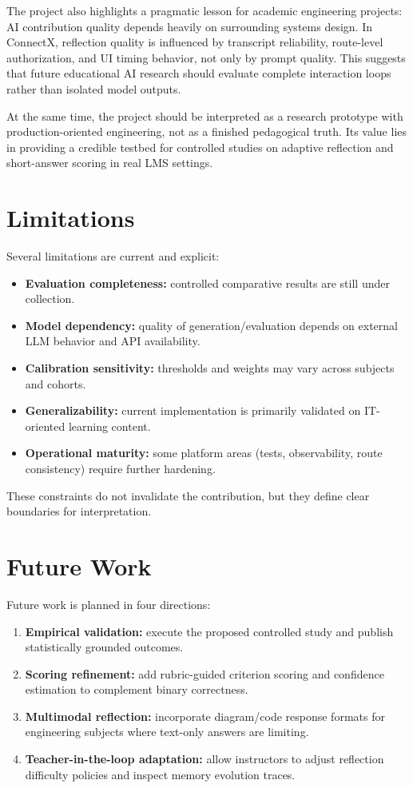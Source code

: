 \documentclass[conference]{IEEEtran}
\begin{document}
The project also highlights a pragmatic lesson for academic engineering projects: AI contribution quality depends heavily on surrounding systems design. In ConnectX, reflection quality is influenced by transcript reliability, route-level authorization, and UI timing behavior, not only by prompt quality. This suggests that future educational AI research should evaluate complete interaction loops rather than isolated model outputs.

At the same time, the project should be interpreted as a research prototype with production-oriented engineering, not as a finished pedagogical truth. Its value lies in providing a credible testbed for controlled studies on adaptive reflection and short-answer scoring in real LMS settings.

\section{Limitations}
Several limitations are current and explicit:
\begin{itemize}
\item \textbf{Evaluation completeness:} controlled comparative results are still under collection.
\item \textbf{Model dependency:} quality of generation/evaluation depends on external LLM behavior and API availability.
\item \textbf{Calibration sensitivity:} thresholds and weights may vary across subjects and cohorts.
\item \textbf{Generalizability:} current implementation is primarily validated on IT-oriented learning content.
\item \textbf{Operational maturity:} some platform areas (tests, observability, route consistency) require further hardening.
\end{itemize}

These constraints do not invalidate the contribution, but they define clear boundaries for interpretation.

\section{Future Work}
Future work is planned in four directions:
\begin{enumerate}
\item \textbf{Empirical validation:} execute the proposed controlled study and publish statistically grounded outcomes.
\item \textbf{Scoring refinement:} add rubric-guided criterion scoring and confidence estimation to complement binary correctness.
\item \textbf{Multimodal reflection:} incorporate diagram/code response formats for engineering subjects where text-only answers are limiting.
\item \textbf{Teacher-in-the-loop adaptation:} allow instructors to adjust reflection difficulty policies and inspect memory evolution traces.
\end{enumerate}
\end{document}
